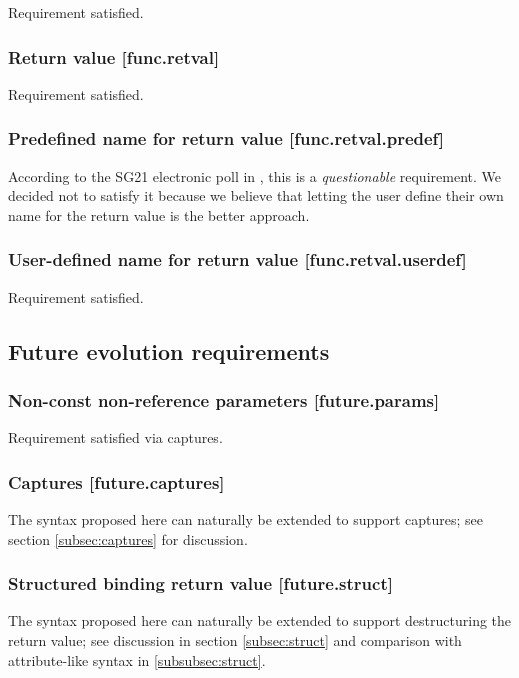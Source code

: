 Requirement satisfied.

\subsubsection{Return value  [func.retval]}

Requirement satisfied.

\subsubsection{Predefined name for return value  [func.retval.predef]}

According to the SG21 electronic poll in \cite{P2885R2}, this is a \emph{questionable} requirement. We decided not to satisfy it because we believe that letting the user define their own name for the return value is the better approach.

\subsubsection{User-defined name for return value  [func.retval.userdef]}

Requirement satisfied.

\subsection{Future evolution requirements}

\subsubsection{Non-const non-reference parameters  [future.params]}

Requirement satisfied via captures.

\subsubsection{Captures  [future.captures]}

The syntax proposed here can naturally be extended to support captures; see section \ref{subsec:captures} for discussion.

\subsubsection{Structured binding return value  [future.struct]}

The syntax proposed here can naturally be extended to support destructuring the return value; see discussion in section \ref{subsec:struct} and comparison with attribute-like syntax in \ref{subsubsec:struct}.

